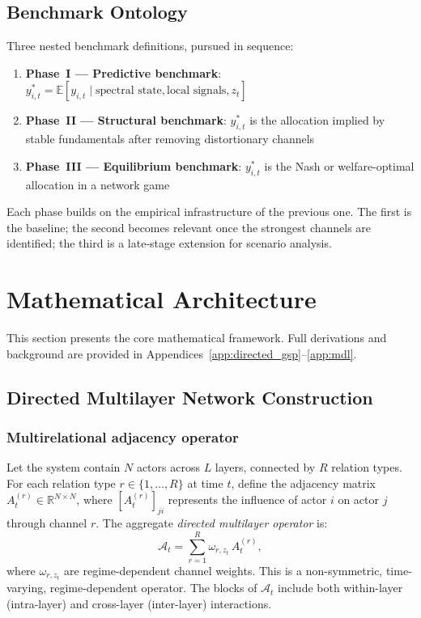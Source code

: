 \documentclass[11pt,a4paper]{article}
\theoremstyle{definition}
\newcommand{\R}{\mathbb{R}}
\newcommand{\E}{\mathbb{E}}
\begin{document}
\subsection{Benchmark Ontology}
\label{sec:benchmark_ontology}

Three nested benchmark definitions, pursued in sequence:
\begin{keybox}
\begin{enumerate}[nosep]
  \item \textbf{Phase~I --- Predictive benchmark}: $y^*_{i,t} = \E[y_{i,t} \mid \text{spectral state}, \text{local signals}, z_t]$
  \item \textbf{Phase~II --- Structural benchmark}: $y^*_{i,t}$ is the allocation implied by stable fundamentals after removing distortionary channels
  \item \textbf{Phase~III --- Equilibrium benchmark}: $y^*_{i,t}$ is the Nash or welfare-optimal allocation in a network game
\end{enumerate}
Each phase builds on the empirical infrastructure of the previous one. The first is the baseline; the second becomes relevant once the strongest channels are identified; the third is a late-stage extension for scenario analysis.
\end{keybox}


\section{Mathematical Architecture}
\label{sec:math}

This section presents the core mathematical framework. Full derivations and background are provided in Appendices~\ref{app:directed_gsp}--\ref{app:mdl}.

\subsection{Directed Multilayer Network Construction}
\label{sec:network}

\subsubsection{Multirelational adjacency operator}

Let the system contain $N$ actors across $L$ layers, connected by $R$ relation types. For each relation type $r \in \{1,\ldots,R\}$ at time $t$, define the adjacency matrix $A^{(r)}_t \in \R^{N \times N}$, where $[A^{(r)}_t]_{ji}$ represents the influence of actor $i$ on actor $j$ through channel $r$. The aggregate \emph{directed multilayer operator} is:
\begin{equation}
  \mathcal{A}_t = \sum_{r=1}^{R} \omega_{r,z_t}\, A^{(r)}_t,
  \label{eq:multilayer_op}
\end{equation}
where $\omega_{r,z_t}$ are regime-dependent channel weights. This is a non-symmetric, time-varying, regime-dependent operator. The blocks of $\mathcal{A}_t$ include both within-layer (intra-layer) and cross-layer (inter-layer) interactions.
\end{document}
